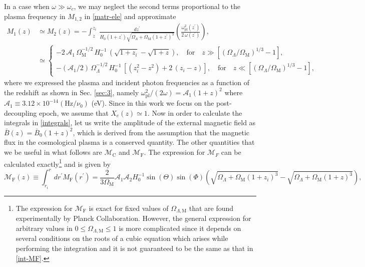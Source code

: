\documentclass[a4paper,11pt]{article}
\begin{document}
In a case when $\omega\gg \omega_c$, we may neglect the second terms proportional to the plasma frequency in $M_{1, 2}$ in \eqref{matr-ele} and approximate
\begin{align}\label{M1}
M_1(z) & \simeq M_2(z)=-\int_{z}^{z_i}\,\frac{dz^{\prime}}{H_0(1+z^\prime)\sqrt{\Omega_\Lambda+\Omega_\text{M}(1+z^\prime)^3}}\left(\frac{\omega_\textrm{pl}^2(z^\prime)}{2\,\omega(z^\prime)}\right), \nonumber \\ & \simeq \begin{cases} -2\, \mathcal A_1\,\Omega_\text{M}^{-1/2}\,H_0^{-1}\,\left(\sqrt{1+z_i}-\sqrt{1+z}\right),\quad \text{for}\quad z\gg \left[(\Omega_\Lambda/\Omega_\textrm{M})^{1/3}-1\right], \\
- (\mathcal A_1/2)\,\Omega_\Lambda^{-1/2}\,H_0^{-1}\,\left[(z_i^2-z^2)+2\,(z_i-z)\right],\quad \text{for}\quad z\ll \left[(\Omega_\Lambda/\Omega_\textrm{M})^{1/3}-1\right],
\end{cases}
\end{align}
where we expressed the plasma and incident photon frequencies as a function of the redshift as shown in Sec. \ref{sec:3}, namely $\omega_\text{pl}^2/(2\omega)=\mathcal A_1 (1+z)^2$ where $\mathcal A_1\equiv 3.12\times 10^{-14}(\text{Hz}/\nu_0)$ (eV). Since in this work we focus on the post-decoupling epoch, we assume that $X_e(z)\simeq 1$. Now in order to calculate the integrals in \eqref{integrals}, let us write the amplitude of the external magnetic field as $\bar B(z)=\bar B_0(1+z)^2$, which is derived from the assumption that the magnetic flux in the cosmological plasma is a conserved quantity. The other quantities that we be useful in what follows are $\mathcal M_\text{C}$ and $\mathcal M_\text{F}$. The expression for $\mathcal M_{F}$ can be calculated exactly\footnote{The expression for $\mathcal M_\text{F}$ is exact for fixed values of $\Omega_{\Lambda, \text{M}}$ that are found experimentally by Planck Collaboration. However, the general expression for arbitrary values in $0\leq \Omega_{\Lambda, \text{M}}\leq 1$ is more complicated since it depends on several conditions on the roots of a cubic equation which arises while performing the integration and it is not guaranteed to be the same as that in \eqref{int-MF}.} and is given by
\begin{equation}\label{int-MF}
\mathcal M_\text{F}(z) \equiv \int_{r_i}^r dr^\prime M_\text{F}(r^\prime)=\frac{2}{3 \Omega_\text{M}}\mathcal A_1 \mathcal A_2 H_0^{-1} \sin(\Theta)\sin(\Phi)\left(\sqrt{\Omega_\Lambda +\Omega_\text{M}(1+z_i)^3} - \sqrt{\Omega_\Lambda +\Omega_\text{M}(1+z)^3}\right),
\end{equation}
\end{document}
